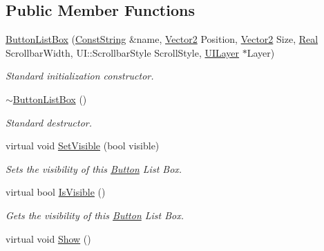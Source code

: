 \subsection*{Public Member Functions}
\begin{DoxyCompactItemize}
\item 
\hyperlink{classphys_1_1UI_1_1ButtonListBox_a1360d155570a277a169b54a6c85ace0d}{ButtonListBox} (\hyperlink{namespacephys_a5ce5049f8b4bf88d6413c47b504ebb31}{ConstString} \&name, \hyperlink{classphys_1_1Vector2}{Vector2} Position, \hyperlink{classphys_1_1Vector2}{Vector2} Size, \hyperlink{namespacephys_af7eb897198d265b8e868f45240230d5f}{Real} ScrollbarWidth, UI::ScrollbarStyle ScrollStyle, \hyperlink{classphys_1_1UILayer}{UILayer} $\ast$Layer)
\begin{DoxyCompactList}\small\item\em Standard initialization constructor. \item\end{DoxyCompactList}\item 
\hypertarget{classphys_1_1UI_1_1ButtonListBox_afb7cf0d76f1f6825276694f0ebb7f4a6}{
\hyperlink{classphys_1_1UI_1_1ButtonListBox_afb7cf0d76f1f6825276694f0ebb7f4a6}{$\sim$ButtonListBox} ()}
\label{d4/dd7/classphys_1_1UI_1_1ButtonListBox_afb7cf0d76f1f6825276694f0ebb7f4a6}

\begin{DoxyCompactList}\small\item\em Standard destructor. \item\end{DoxyCompactList}\item 
virtual void \hyperlink{classphys_1_1UI_1_1ButtonListBox_acee378e954050801fa8fffe835441bf4}{SetVisible} (bool visible)
\begin{DoxyCompactList}\small\item\em Sets the visibility of this \hyperlink{classphys_1_1UI_1_1Button}{Button} List Box. \item\end{DoxyCompactList}\item 
virtual bool \hyperlink{classphys_1_1UI_1_1ButtonListBox_a1282a1494079e47b48c8e3296b1a8bb0}{IsVisible} ()
\begin{DoxyCompactList}\small\item\em Gets the visibility of this \hyperlink{classphys_1_1UI_1_1Button}{Button} List Box. \item\end{DoxyCompactList}\item 
\hypertarget{classphys_1_1UI_1_1ButtonListBox_ad41d563b4fab1699fb14b56f776d5b1f}{
virtual void \hyperlink{classphys_1_1UI_1_1ButtonListBox_ad41d563b4fab1699fb14b56f776d5b1f}{Show} ()}
\label{d4/dd7/classphys_1_1UI_1_1ButtonListBox_ad41d563b4fab1699fb14b56f776d5b1f}


\end{DoxyCompactItemize}
